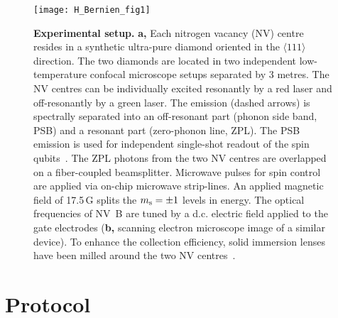 \begin{figure}[tp]
	\centering
	\texttt{[image: H\_Bernien\_fig1]}
	\caption{\label{fig:LDE-fig1-setup} \textbf{Experimental setup.} \textbf{a,} Each nitrogen vacancy (NV) centre resides in a synthetic ultra-pure diamond oriented in the $\langle 111\rangle$ direction. The two diamonds are located in two independent low-temperature confocal microscope setups separated by 3 metres. The NV centres can be individually excited resonantly by a red laser and off-resonantly by a green laser. The emission (dashed arrows) is spectrally separated into an off-resonant part (phonon side band, PSB) and a resonant part (zero-phonon line, ZPL). The PSB emission is used for independent single-shot readout of the spin qubits~\cite{Robledo2011}. The ZPL photons from the two NV centres are overlapped on a fiber-coupled beamsplitter. Microwave pulses for spin control are applied via on-chip microwave strip-lines. An applied magnetic field of 17.5\,G splits the $m_\mathrm s = \pm1$ levels in energy. The optical frequencies of NV~B are tuned by a d.c. electric field applied to the gate electrodes (\textbf{b,} scanning electron microscope image of a similar device). To enhance the collection efficiency, solid immersion lenses have been milled around the two NV centres~\cite{Robledo2011}. 
	}
\end{figure}

	
\section{Protocol}

